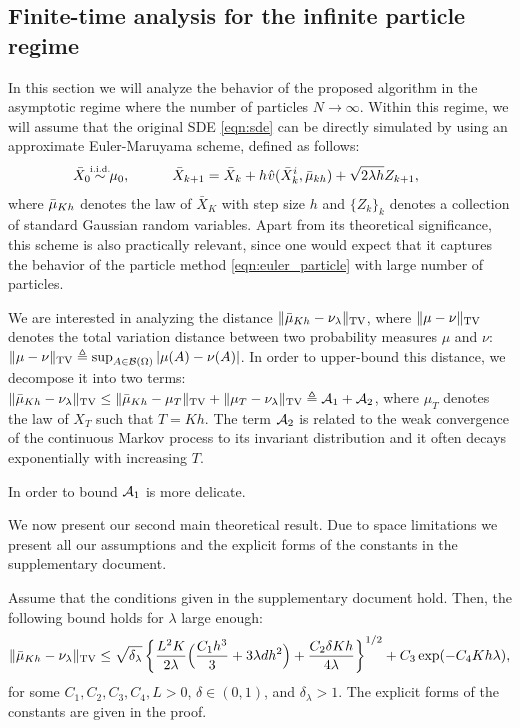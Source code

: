 
\subsection{Finite-time analysis for the infinite particle regime}



In this section we will analyze the behavior of the proposed algorithm in the asymptotic regime where the number of particles $N \rightarrow \infty$. Within this regime, we will assume that the original SDE \eqref{eqn:sde} can be directly simulated by using an approximate Euler-Maruyama scheme, defined as follows:
\begin{align}
\bar{X}_0 \simiid \mu_0, \quad \qquad \bar{X}_{k+1} = \bar{X}_k + h \hspace{0.5pt} \hat{v}(\bar{X}^i_k, \bar{\mu}_{kh} ) + \sqrt{2 \lambda h} Z_{k+1}, \qquad
\end{align}
where $\bar{\mu}_{Kh}$ denotes the law of $\bar{X}_K$ with step size $h$ and $\{Z_k\}_{k}$ denotes a collection of standard Gaussian random variables. Apart from its theoretical significance, this scheme is also practically relevant, since one would expect that it captures the behavior of the particle method \eqref{eqn:euler_particle} with large number of particles. 

We are interested in analyzing the distance $\| \bar{\mu}_{Kh} - \nu_\lambda \|_{\textnormal{TV}}$, where $\|\mu-\nu\|_{\textnormal{TV}}$ denotes the total variation distance between two probability measures $\mu$ and $\nu$: $\|\mu-\nu\|_{\textnormal{TV}}\triangleq \sup_{A \in {\cal B}(\Omega)} |\mu(A) -\nu(A) |$. 
%
In order to upper-bound this distance, we decompose it into two terms: $\| \bar{\mu}_{Kh} - \nu_\lambda \|_{\textnormal{TV}} \leq \| \bar{\mu}_{Kh} - \mu_T \|_{\textnormal{TV}} + \| \mu_{T} - \nu_\lambda \|_{\textnormal{TV}} \triangleq {\cal A}_1 + {\cal A}_2$, where $\mu_T$ denotes the law of $X_T$ such that $T=Kh$. The term ${\cal A}_2$ is related to the weak convergence of the continuous Markov process to its invariant distribution and it often decays exponentially with increasing $T$. 

In order to bound ${\cal A}_1$ is more delicate. 

We now present our second main theoretical result. Due to space limitations we present all our assumptions and the explicit forms of the constants in the supplementary document. 
\begin{thm}
\label{thm:euler}
Assume that the conditions given in the supplementary document hold. Then, the following bound holds for $\lambda$ large enough:
\begin{align}
\| \bar{\mu}_{Kh} - \nu_\lambda \|_{\textnormal{TV}} \leq \sqrt{\delta_\lambda} \left \lbrace  \frac{L^2 K}{2\lambda} \Bigl( \frac{C_1 h^3}{3} + 3 \lambda d h^2 \Bigr) + \frac{C_2  \delta K h}{4\lambda} \right \rbrace^{1/2} +  C_3 \exp(-C_4 Kh \lambda),
\end{align}
for some $C_1,C_2,C_3,C_4,L >0$, $\delta \in (0,1)$, and $\delta_\lambda >1$. The explicit forms of the constants are given in the proof.
\end{thm}




